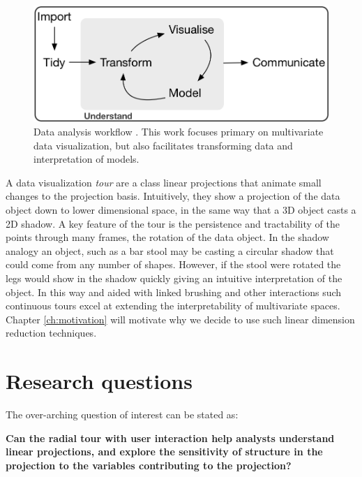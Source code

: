 \documentclass{template/monashthesis}
\begin{document}
\begin{figure}

{\centering \includegraphics[width=1\linewidth,]{./figures/data_analysis_workflow} 

}

\caption{Data analysis workflow \autocite{wickham_r_2017}. This work focuses primary on multivariate data visualization, but also facilitates transforming data and interpretation of models.}\label{fig:dataanalysisworkflow}
\end{figure}

A data visualization \emph{tour} \autocite{cook_grand_2008,lee_review_2021} are a class linear projections that animate small changes to the projection basis. Intuitively, they show a projection of the data object down to lower dimensional space, in the same way that a 3D object casts a 2D shadow. A key feature of the tour is the persistence and tractability of the points through many frames, the rotation of the data object. In the shadow analogy an object, such as a bar stool may be casting a circular shadow that could come from any number of shapes. However, if the stool were rotated the legs would show in the shadow quickly giving an intuitive interpretation of the object. In this way and aided with linked brushing and other interactions such continuous tours excel at extending the interpretability of multivariate spaces. Chapter \ref{ch:motivation} will motivate why we decide to use such linear dimension reduction techniques.

\hypertarget{research-questions}{%
\section{Research questions}\label{research-questions}}

The over-arching question of interest can be stated as:

\textbf{Can the radial tour with user interaction help analysts understand linear projections, and explore the sensitivity of structure in the projection to the variables contributing to the projection?}
\end{document}
